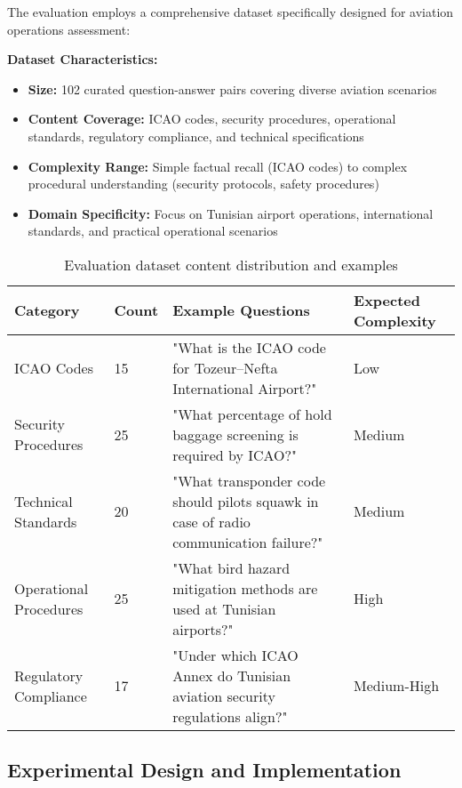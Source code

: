 The evaluation employs a comprehensive dataset specifically designed for aviation operations assessment:

\textbf{Dataset Characteristics:}
\begin{itemize}
    \item \textbf{Size:} 102 curated question-answer pairs covering diverse aviation scenarios
    \item \textbf{Content Coverage:} ICAO codes, security procedures, operational standards, regulatory compliance, and technical specifications
    \item \textbf{Complexity Range:} Simple factual recall (ICAO codes) to complex procedural understanding (security protocols, safety procedures)
    \item \textbf{Domain Specificity:} Focus on Tunisian airport operations, international standards, and practical operational scenarios
\end{itemize}

\begin{table}[H]
\centering
\caption{Evaluation dataset content distribution and examples}
\label{tab:dataset_content_s3}
\begin{tabular}{|p{3cm}|p{2cm}|p{7cm}|p{3cm}|}
\hline
\textbf{Category} & \textbf{Count} & \textbf{Example Questions} & \textbf{Expected Complexity} \\
\hline
ICAO Codes & 15 & "What is the ICAO code for Tozeur–Nefta International Airport?" & Low \\
\hline
Security Procedures & 25 & "What percentage of hold baggage screening is required by ICAO?" & Medium \\
\hline
Technical Standards & 20 & "What transponder code should pilots squawk in case of radio communication failure?" & Medium \\
\hline
Operational Procedures & 25 & "What bird hazard mitigation methods are used at Tunisian airports?" & High \\
\hline
Regulatory Compliance & 17 & "Under which ICAO Annex do Tunisian aviation security regulations align?" & Medium-High \\
\hline
\end{tabular}
\end{table}

\subsection{Experimental Design and Implementation}
\label{subsec:experimental_design_s3}

